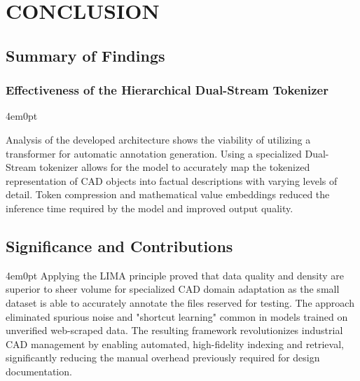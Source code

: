 \renewcommand{\thechapter}{\Roman{chapter}}
\chapter[]{CONCLUSION}
\renewcommand{\thechapter}{\arabic{chapter}}
\begingroup
\fontsize{12pt}{\baselineskip}\selectfont

\section{Summary of Findings}

\subsection{Effectiveness of the Hierarchical Dual-Stream Tokenizer}
\begin{indentedblock}{4em}{0pt}
	
	Analysis of the developed architecture shows the viability of utilizing a transformer for automatic annotation generation. Using a specialized Dual-Stream tokenizer allows for the model to accurately map the tokenized representation of CAD objects into factual descriptions with varying levels of detail. Token compression and mathematical value embeddings reduced the inference time required by the model and improved output quality.
	
\end{indentedblock}

\section{Significance and Contributions}
\begin{indentedblock}{4em}{0pt}
	Applying the LIMA principle proved that data quality and density are superior to sheer volume for specialized CAD domain adaptation as the small dataset is able to accurately annotate the files reserved for testing. The approach eliminated spurious noise and "shortcut learning" common in models trained on unverified web-scraped data. The resulting framework revolutionizes industrial CAD management by enabling automated, high-fidelity indexing and retrieval, significantly reducing the manual overhead previously required for design documentation.
\end{indentedblock}

